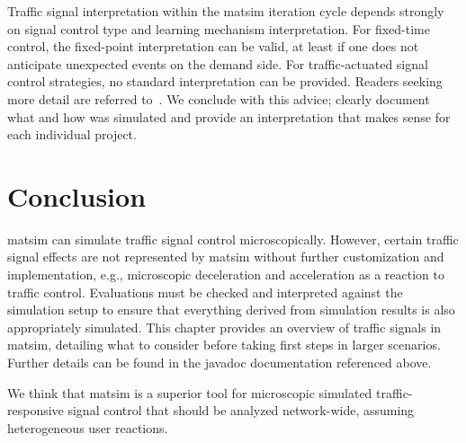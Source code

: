 Traffic signal interpretation within the \gls{matsim} iteration cycle depends strongly on signal control type and learning mechanism interpretation. 
For fixed-time control, the fixed-point interpretation can be valid, at least if one does not anticipate  unexpected events on the demand side. 
For traffic-actuated signal control strategies, no standard interpretation can be provided. 
Readers seeking more detail are referred to~\citet[][pp.~75]{Grether2014PhD}.  
We conclude with this advice; clearly document what and how was simulated and provide an interpretation that makes sense for each individual project.    

\section{Conclusion} 
\label{sec:signals_evaluation_conclusion}
\gls{matsim} can simulate traffic signal control microscopically. 
However, certain traffic signal effects are not represented by \gls{matsim} without further customization and implementation, e.g., microscopic deceleration and acceleration as a reaction to traffic control. Evaluations must be checked and interpreted against the simulation setup to ensure that everything derived from simulation results is also appropriately simulated.  
This chapter provides an overview of traffic signals in \gls{matsim}, detailing what to consider before taking first steps in larger scenarios. Further details can be found in the \gls{javadoc} documentation referenced above. 

We think that \gls{matsim} is a superior tool for microscopic simulated traffic-responsive signal control that should be analyzed network-wide, assuming heterogeneous user reactions. 

 
